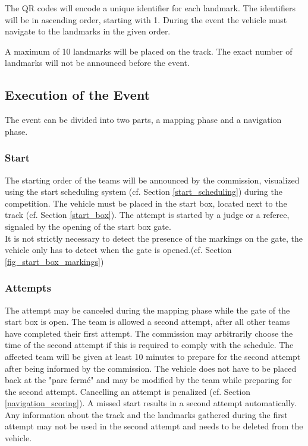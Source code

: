 \begin{highlight}[yellow]
    The QR codes will encode a unique identifier for each landmark. The identifiers
    will be in ascending order, starting with 1. During the event the vehicle must
    navigate to the landmarks in the given order.

    A maximum of 10 landmarks will be placed on the track. The exact number of
    landmarks will not be announced before the event.

    \subsection{Execution of the Event}

    The event can be divided into two parts, a mapping phase and a navigation
    phase.

    \subsubsection{Start}

    The starting order of the teams will be announced by the commission, visualized
    using the start scheduling system (cf. Section \ref{start_scheduling}) during
    the competition. The vehicle must be placed in the start box, located next to
    the track (cf. Section \ref{start_box}). The attempt is started by a judge or a
    referee, signaled by the opening of the start box gate.\\ It is not strictly
    necessary to detect the presence of the markings on the gate, the vehicle only
    has to detect when the gate is opened.(cf. Section
    \ref{fig_start_box_markings})

    \subsubsection{Attempts}

    The attempt may be canceled during the mapping phase while the gate of the
    start box is open. The team is allowed a second attempt, after all other teams
    have completed their first attempt. \newline The commission may arbitrarily
    choose the time of the second attempt if this is required to comply with the
    schedule. The affected team will be given at least 10 minutes to prepare for
    the second attempt after being informed by the commission. The vehicle does not
    have to be placed back at the "parc fermé" and may be modified by the team
    while preparing for the second attempt. Cancelling an attempt is penalized (cf.
    Section \ref{navigation_scoring}). A missed start results in a second attempt
    automatically. Any information about the track and the landmarks gathered
    during the first attempt may not be used in the second attempt and needs to be
    deleted from the vehicle.


\end{highlight}
